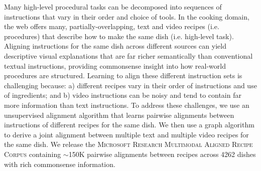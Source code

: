 Many high-level procedural tasks can be decomposed into sequences of instructions that vary in their order and choice of tools. In the cooking  domain, the web offers many, partially-overlapping, text and video recipes (i.e. procedures) that describe how to make the same dish (i.e. high-level task). Aligning instructions for the same dish across different sources can yield descriptive visual explanations that are far richer semantically than conventional textual instructions, providing commonsense insight into how real-world procedures are structured. Learning to align these different instruction sets is challenging because: a) different recipes vary in their order of instructions and use of ingredients; and b) video instructions can be noisy and tend to contain far more information than text instructions. To address these challenges, we use an unsupervised alignment algorithm that learns pairwise alignments between instructions of different recipes for the same dish. We then use a graph algorithm to derive a joint alignment between multiple text and multiple video recipes for the same dish. We release the \textsc{Microsoft Research Multimodal Aligned Recipe Corpus} containing $\sim$150K pairwise alignments between recipes across 4262 dishes with rich commonsense information.
